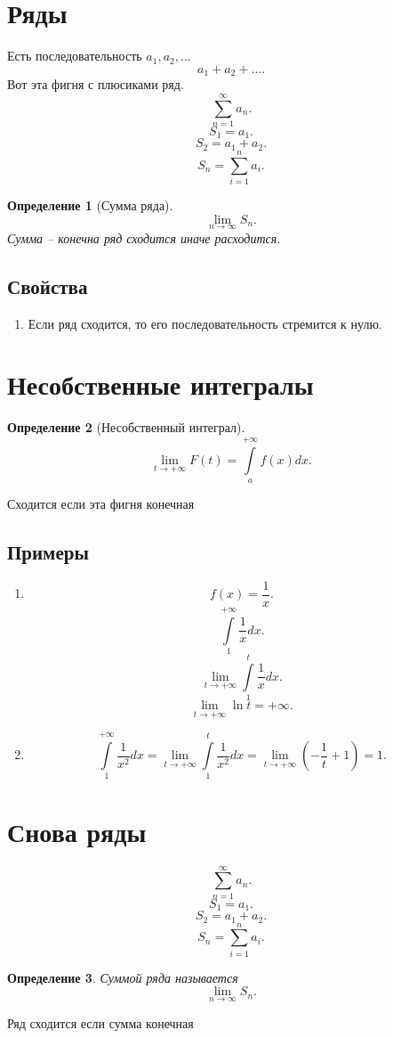 \documentclass{scrartcl}
\newtheorem{definition}{Определение}
\begin{document}
\section{Ряды}
Есть последовательность $a_1,a_2,\dots$
\[
a_1 + a_2 + \dots
.\] 
Вот эта фигня с плюсиками ряд.
\[
\sum_{n=1}^{\infty} a_{n}
.\] 
\[
S_1 = a_1
.\] 
\[
S_2 = a_1 + a_{2}
.\] 
\[
S_{n} = \sum_{i = 1}^{n} a_{i}
.\] 
\begin{definition}[Сумма ряда]
    \[
    \lim_{n \to \infty} S_{n}
    .\] 
    Сумма -- конечна ряд сходится иначе расходится.
\end{definition}
\subsection{Свойства}
\begin{enumerate}
    \item Если ряд сходится, то его последовательность стремится к нулю.
\end{enumerate}
\section{Несобственные интегралы}
\begin{definition}[Несобственный интеграл]
    \[
    \lim_{t \to + \infty} F(t) = \int\limits_{a}^{+\infty} f(x) dx
    .\] 
\end{definition}
Сходится если эта фигня конечная
\subsection{Примеры}
\begin{enumerate}
    \item 
        \[
        f(x) = \frac{1}{x}
        .\] 
        \[
        \int\limits_{1}^{+\infty} \frac{1}{x}dx 
        .\] 
        \[
        \lim_{t \to +\infty} \int\limits_{1}^{t} \frac{1}{x}dx 
        .\] 
        \[
            \lim_{t \to +\infty} \ln{t} = +\infty
        .\] 
    \item
        \[
        \int\limits_{1}^{+\infty}  \frac{1}{x^2}dx = \lim_{t \to +\infty} \int\limits_{1}^{t} \frac{1}{x^2} dx =
        \lim_{t \to +\infty} (-\frac{1}{t} + 1) = 1
        .\] 
\end{enumerate}
\section{Снова ряды}
\[
    \sum_{n=1}^{\infty} a_{n}
.\] 
\[
S_1 = a_1
.\] 
\[
S_2 = a_1 + a_2
.\] 
\[
S_{n} = \sum_{i = 1}^{n} a_{i}
.\] 
\begin{definition}
    Суммой ряда называется
     \[
    \lim_{n \to \infty} S_{n}
    .\] 
\end{definition}
Ряд сходится если сумма конечная
\end{document}

